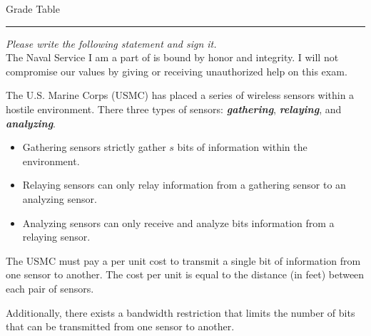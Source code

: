 \documentclass[12pt]{exam}
\begin{document}
\bigskip
\begin{center}
Grade Table\\
\addpoints
\gradetable[v][questions]
\end{center}

\noindent
\rule[2ex]{\textwidth}{2pt}

\emph{Please write the following statement and sign it.}\\
The Naval Service I am a part of is bound by honor
and integrity. I will not compromise our values by
giving or receiving unauthorized help on this exam.

\newpage %

\begin{questions}
\question The U.S. Marine Corps (USMC) has placed a series of wireless sensors within a hostile environment. There three types of sensors: \emph{\textbf{gathering}}, \emph{\textbf{relaying}}, and \emph{\textbf{analyzing}}.
\begin{itemize}
    \item Gathering sensors strictly gather $s$ bits of information within the environment.
    \item Relaying sensors can only relay information from a gathering sensor to an analyzing sensor.
    \item Analyzing sensors can only receive and analyze bits information from a relaying sensor.  

\end{itemize}

The USMC must pay a per unit cost to transmit a single bit of information from one sensor to another. The cost per unit is equal to the distance (in feet) between each pair of sensors.

Additionally, there exists a bandwidth restriction that limits the number of bits that can be transmitted from one sensor to another. 

\newpage

\end{questions}
\end{document}
